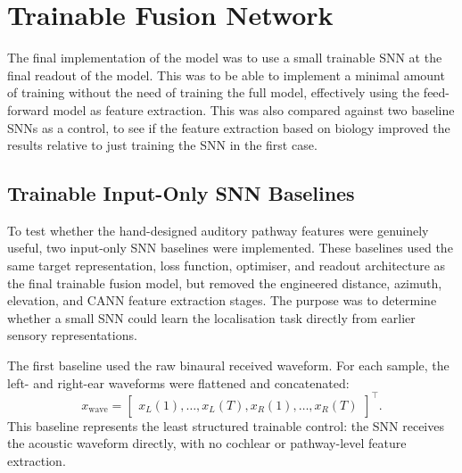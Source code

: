 

\section{Trainable Fusion Network}

The final implementation of the model was to use a small trainable SNN at the final readout of the model. This was to be able to implement a minimal amount of training without the need of training the full model, effectively using the feed-forward model as feature extraction. This was also compared against two baseline SNNs as a control, to see if the feature extraction based on biology improved the results relative to just training the SNN in the first case.

\subsection{Trainable Input-Only SNN Baselines}

To test whether the hand-designed auditory pathway features were genuinely useful, two input-only SNN baselines were implemented. These baselines used the same target representation, loss function, optimiser, and readout architecture as the final trainable fusion model, but removed the engineered distance, azimuth, elevation, and CANN feature extraction stages. The purpose was to determine whether a small SNN could learn the localisation task directly from earlier sensory representations.

The first baseline used the raw binaural received waveform. For each sample, the left- and right-ear waveforms were flattened and concatenated:
\begin{equation}
    x_{\mathrm{wave}}
    =
    \begin{bmatrix}
        x_L(1),\ldots,x_L(T),
        x_R(1),\ldots,x_R(T)
    \end{bmatrix}^{\top}.
\end{equation}
This baseline represents the least structured trainable control: the SNN receives the acoustic waveform directly, with no cochlear or pathway-level feature extraction.

